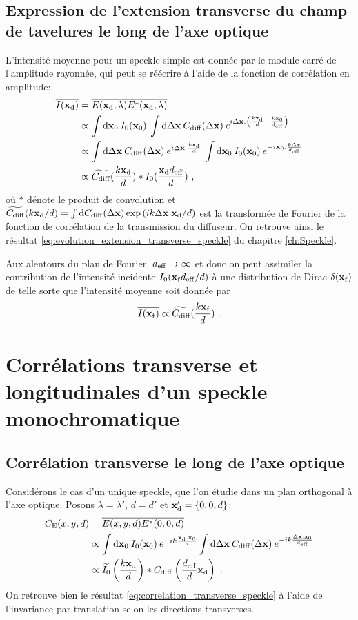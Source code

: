 \subsection{Expression de l'extension transverse du champ de tavelures le long de l'axe optique}
L'intensité moyenne pour un speckle simple est donnée par le module carré de l'amplitude rayonnée, qui peut se réécrire à l'aide de la fonction de corrélation en amplitude:
\begin{align}
\overline{I(\mathbf{x}_{\mathrm{d}})} &= \overline{E(\mathbf{x}_{\mathrm{d}},\lambda)E^*(\mathbf{x}_{\mathrm{d}},\lambda)} \\
&\propto \int{\mathop{}\mathopen{}\mathrm{d}\mathbf{x}_0\: I_0(\mathbf{x}_0) \: \int{\mathop{}\mathopen{}\mathrm{d}\Delta\mathbf{x}\: C_{\mathrm{diff}}(\Delta\mathbf{x}) \: e^{i\Delta\mathbf{x}. \left( \frac{k\mathbf{x}_{\mathrm{d}}}{d}-\frac{k\mathbf{x}_0}{d_{\mathrm{eff}}}\right)}}} \\
&\propto \int{\mathop{}\mathopen{}\mathrm{d}\Delta\mathbf{x}\: C_{\mathrm{diff}}(\Delta\mathbf{x}) \: e^{i \Delta\mathbf{x}. \frac{k\mathbf{x}_{\mathrm{d}}}{d}} \: \int{\mathop{}\mathopen{}\mathrm{d}\mathbf{x}_0\: I_0(\mathbf{x}_0) \: e^{-i \mathbf{x}_0.\frac{k\Delta\mathbf{x}}{d_{\mathrm{eff}}}}}} \\
&\propto \widetilde{C_{\mathrm{diff}}}(\frac{k\mathbf{x}_{\mathrm{d}}}{d}) \ast I_0(\frac{\mathbf{x}_{\mathrm{d}}d_{\mathrm{eff}}}{d}) \text{ ,}
\end{align}
où $\ast$ dénote le produit de convolution et $\widetilde{C_{\mathrm{diff}}}(k\mathbf{x}_{\mathrm{d}}/d)=\int{\mathop{}\mathopen{}\mathrm{d}C_{\mathrm{diff}}(\Delta\mathbf{x})\exp{(ik\Delta\mathbf{x}.\mathbf{x}_{\mathrm{d}}/d)}}$ est la transformée de Fourier de la fonction de corrélation de la transmission du diffuseur. On retrouve ainsi le résultat \ref{eq:evolution_extension_transverse_speckle} du chapitre \ref{ch:Speckle}.

Aux alentours du plan de Fourier, $d_{\mathrm{eff}}\rightarrow\infty$ et donc on peut assimiler la contribution de l'intensité incidente $I_0(\mathbf{x}_{\mathrm{f}}d_{\mathrm{eff}}/d)$ à une distribution de Dirac $\delta(\mathbf{x}_{\mathrm{f}})$ de telle sorte que l'intensité moyenne soit donnée par
\begin{equation}
\overline{I(\mathbf{x}_{\mathrm{f}})} \propto \widetilde{C_{\mathrm{diff}}} (\frac{k\mathbf{x}_{\mathrm{f}}}{d}) \text{ .}
\end{equation}





\section{Corrélations transverse et longitudinales d'un speckle monochromatique}%
\subsection{Corrélation transverse le long de l'axe optique}
Considérons le cas d'un unique speckle, que l'on étudie dans un plan orthogonal à l'axe optique. Posons $\lambda = \lambda'$, $d=d'$ et $\mathbf{x}_{\mathrm{d}}'=\lbrace 0,0,d \rbrace$:
\begin{align}
C_{\mathrm{E}}(x,y,d)&=\overline{E(x,y,d)E^*(0,0,d)}\\
&\propto \int{\mathop{}\mathopen{}\mathrm{d}\mathbf{x}_0\: I_0(\mathbf{x}_0) \: e^{-ik\frac{\mathbf{x}_{\mathrm{d}}.\mathbf{x}_0}{d}} \int{\mathop{}\mathopen{}\mathrm{d}\Delta\mathbf{x}\: C_{\mathrm{diff}}(\Delta\mathbf{x})\: e^{-ik\frac{\Delta\mathbf{x}.\mathbf{x}_0}{d_{\mathrm{eff}}}}}}\\
&\propto \widetilde{I_0}\left(\frac{k\mathbf{x}_{\mathrm{d}}}{d}\right) \ast C_{\mathrm{diff}} \left( \frac{d_{\mathrm{eff}}}{d} \mathbf{x}_{\mathrm{d}}\right) \text{ .}
\end{align}
On retrouve bien le résultat \ref{eq:correlation_transverse_speckle} à l'aide de l'invariance par translation selon les directions transverses. 

